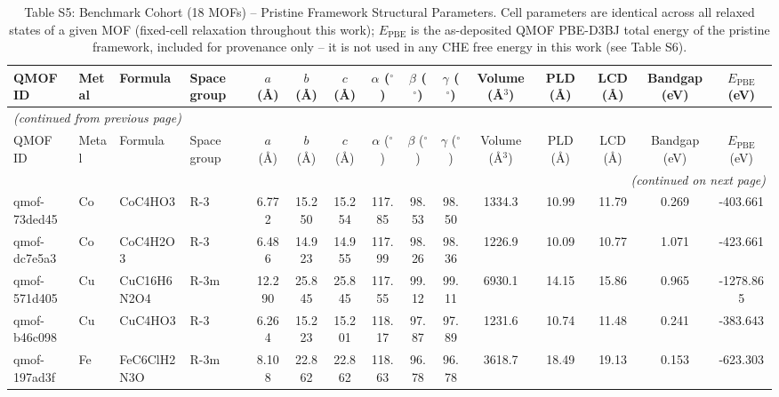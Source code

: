 {\scriptsize
\begin{longtable}{llllccccccccccc}
\caption{Table S5: Benchmark Cohort (18 MOFs) -- Pristine Framework Structural Parameters. Cell parameters are identical across all relaxed states of a given MOF (fixed-cell relaxation throughout this work); $E_{\mathrm{PBE}}$ is the as-deposited QMOF PBE-D3BJ total energy of the pristine framework, included for provenance only -- it is not used in any CHE free energy in this work (see Table S6).} \label{tab:benchmark_pristine_structural} \\
\hline\hline
QMOF ID & Metal & Formula & Space group & $a$ (\AA) & $b$ (\AA) & $c$ (\AA) & $\alpha$ ($^\circ$) & $\beta$ ($^\circ$) & $\gamma$ ($^\circ$) & Volume (\AA$^3$) & PLD (\AA) & LCD (\AA) & Bandgap (eV) & $E_{\mathrm{PBE}}$ (eV) \\
\hline
\endfirsthead
\multicolumn{15}{l}{\textit{(continued from previous page)}} \\
\hline\hline
QMOF ID & Metal & Formula & Space group & $a$ (\AA) & $b$ (\AA) & $c$ (\AA) & $\alpha$ ($^\circ$) & $\beta$ ($^\circ$) & $\gamma$ ($^\circ$) & Volume (\AA$^3$) & PLD (\AA) & LCD (\AA) & Bandgap (eV) & $E_{\mathrm{PBE}}$ (eV) \\
\hline
\endhead
\hline
\multicolumn{15}{r}{\textit{(continued on next page)}} \\
\endfoot
\hline\hline
\endlastfoot
qmof-73ded45 & Co & CoC4HO3 & R-3 & 6.772 & 15.250 & 15.254 & 117.85 & 98.53 & 98.50 & 1334.3 & 10.99 & 11.79 & 0.269 & -403.661 \\
qmof-dc7e5a3 & Co & CoC4H2O3 & R-3 & 6.486 & 14.923 & 14.955 & 117.99 & 98.26 & 98.36 & 1226.9 & 10.09 & 10.77 & 1.071 & -423.661 \\
qmof-571d405 & Cu & CuC16H6N2O4 & R-3m & 12.290 & 25.845 & 25.845 & 117.55 & 99.12 & 99.11 & 6930.1 & 14.15 & 15.86 & 0.965 & -1278.865 \\
qmof-b46c098 & Cu & CuC4HO3 & R-3 & 6.264 & 15.223 & 15.201 & 118.17 & 97.87 & 97.89 & 1231.6 & 10.74 & 11.48 & 0.241 & -383.643 \\
qmof-197ad3f & Fe & FeC6ClH2N3O & R-3m & 8.108 & 22.862 & 22.862 & 118.63 & 96.78 & 96.78 & 3618.7 & 18.49 & 19.13 & 0.153 & -623.303 \\

\end{longtable}}
